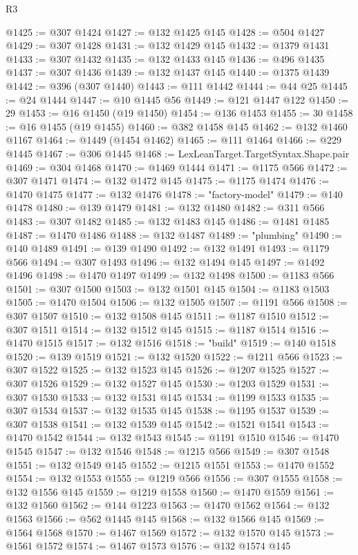 \begin{lexlean}{R3}
\begin{coremodule}
@1425 := @307 @1424
@1427 := @132 @1425 @145
@1428 := @504 @1427
@1429 := @307 @1428
@1431 := @132 @1429 @145
@1432 := @1379 @1431
@1433 := @307 @1432
@1435 := @132 @1433 @145
@1436 := @496 @1435
@1437 := @307 @1436
@1439 := @132 @1437 @145
@1440 := @1375 @1439
@1442 := @396 (@307 @1440)
@1443 := @111 @1442
@1444 := @44 @25
@1445 := @24 @1444
@1447 := @10 @1445 @56
@1449 := @121 @1447 @122
@1450 := 29
@1453 := @16 @1450 (@19 @1450)
@1454 := @136 @1453
@1455 := 30
@1458 := @16 @1455 (@19 @1455)
@1460 := @382 @1458 @145
@1462 := @132 @1460 @1167
@1464 := @1449 (@1454 @1462)
@1465 := @111 @1464
@1466 := @229 @1445
@1467 := @306 @1445
@1468 := LexLeanTarget.TargetSyntax.Shape.pair
@1469 := @304 @1468
@1470 := @1469 @1444
@1471 := @1175 @566
@1472 := @307 @1471
@1474 := @132 @1472 @145
@1475 := @1175 @1474
@1476 := @1470 @1475
@1477 := @132 @1476
@1478 := "factory-model"
@1479 := @140 @1478
@1480 := @139 @1479
@1481 := @132 @1480
@1482 := @311 @566
@1483 := @307 @1482
@1485 := @132 @1483 @145
@1486 := @1481 @1485
@1487 := @1470 @1486
@1488 := @132 @1487
@1489 := "plumbing"
@1490 := @140 @1489
@1491 := @139 @1490
@1492 := @132 @1491
@1493 := @1179 @566
@1494 := @307 @1493
@1496 := @132 @1494 @145
@1497 := @1492 @1496
@1498 := @1470 @1497
@1499 := @132 @1498
@1500 := @1183 @566
@1501 := @307 @1500
@1503 := @132 @1501 @145
@1504 := @1183 @1503
@1505 := @1470 @1504
@1506 := @132 @1505
@1507 := @1191 @566
@1508 := @307 @1507
@1510 := @132 @1508 @145
@1511 := @1187 @1510
@1512 := @307 @1511
@1514 := @132 @1512 @145
@1515 := @1187 @1514
@1516 := @1470 @1515
@1517 := @132 @1516
@1518 := "build"
@1519 := @140 @1518
@1520 := @139 @1519
@1521 := @132 @1520
@1522 := @1211 @566
@1523 := @307 @1522
@1525 := @132 @1523 @145
@1526 := @1207 @1525
@1527 := @307 @1526
@1529 := @132 @1527 @145
@1530 := @1203 @1529
@1531 := @307 @1530
@1533 := @132 @1531 @145
@1534 := @1199 @1533
@1535 := @307 @1534
@1537 := @132 @1535 @145
@1538 := @1195 @1537
@1539 := @307 @1538
@1541 := @132 @1539 @145
@1542 := @1521 @1541
@1543 := @1470 @1542
@1544 := @132 @1543
@1545 := @1191 @1510
@1546 := @1470 @1545
@1547 := @132 @1546
@1548 := @1215 @566
@1549 := @307 @1548
@1551 := @132 @1549 @145
@1552 := @1215 @1551
@1553 := @1470 @1552
@1554 := @132 @1553
@1555 := @1219 @566
@1556 := @307 @1555
@1558 := @132 @1556 @145
@1559 := @1219 @1558
@1560 := @1470 @1559
@1561 := @132 @1560
@1562 := @144 @1223
@1563 := @1470 @1562
@1564 := @132 @1563
@1566 := @562 @1445 @145
@1568 := @132 @1566 @145
@1569 := @1564 @1568
@1570 := @1467 @1569
@1572 := @132 @1570 @145
@1573 := @1561 @1572
@1574 := @1467 @1573
@1576 := @132 @1574 @145

\end{coremodule}
\end{lexlean}
